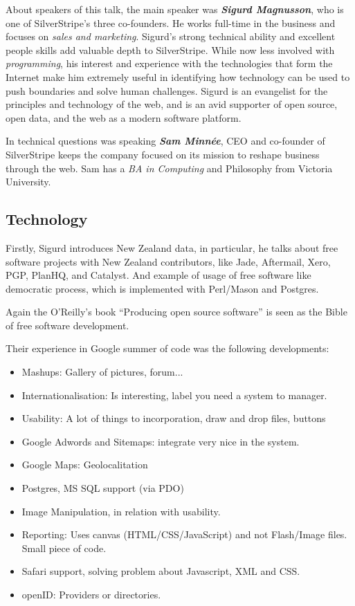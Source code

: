 \documentclass[11pt]{article}
\begin{document}
About speakers of this talk, the main speaker was \emph{\textbf{Sigurd Magnusson}}, who is one of SilverStripe’s three co-founders. He works full-time in the business and focuses on \emph{sales and marketing}.  Sigurd's strong technical ability and excellent people skills add valuable depth to SilverStripe. While now less involved with \emph{programming}, his interest and experience with the technologies that form the Internet make him extremely useful in identifying how technology can be used to push boundaries and solve human challenges. Sigurd is an evangelist for the principles and technology of the web, and is an avid supporter of open source, open data, and the web as a modern software platform.

In technical questions was speaking\emph{ \textbf{Sam Minnée}}, CEO and co-founder of SilverStripe keeps the company focused on its mission to reshape business through the web. Sam has a \emph{BA in Computing} and Philosophy from Victoria University.

\subsection{Technology}
Firstly, Sigurd introduces New Zealand data, in particular, he talks about free software projects with New Zealand contributors, like Jade, Aftermail, Xero, PGP, PlanHQ, and Catalyst. And example of usage of free software like democratic process, which is implemented with Perl/Mason and Postgres. 

Again the O'Reilly's book ``Producing open source software'' is seen as the Bible of free software development.

Their experience in Google summer of code was the following developments:
\begin{itemize}
  \item Mashups: Gallery of pictures, forum...
  \item Internationalisation: Is interesting, label you need a system to manager.
  \item Usability: A lot of things to incorporation, draw and drop files, buttons
  \item Google Adwords and Sitemaps: integrate very nice in the system.
  \item Google Maps: Geolocalitation
  \item Postgres, MS SQL support (via PDO)
  \item Image Manipulation, in relation with usability.
  \item Reporting: Uses canvas (HTML/CSS/JavaScript) and not Flash/Image files. Small piece of code.
  \item Safari support, solving problem about Javascript, XML and CSS.
  \item openID: Providers or directories.
\end{itemize}
\end{document}

